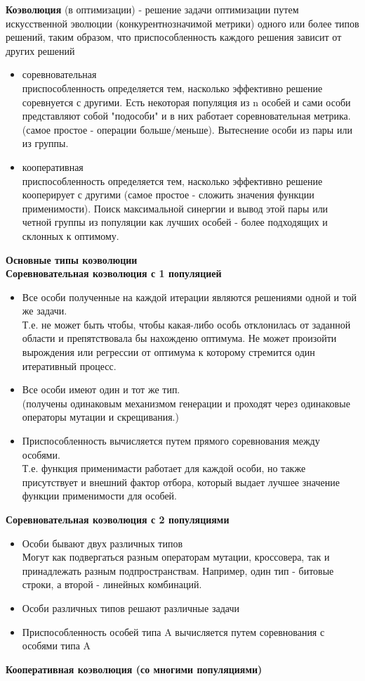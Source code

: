 \textbf{Коэволюция} (в оптимизации) - решение задачи оптимизации путем искусственной эволюции (конкурентнозначимой метрики) одного или более типов решений, таким образом, что приспособленность каждого решения зависит от других решений
\begin{itemize}
    \item соревновательная\\
    приспособленность определяется тем, насколько эффективно решение соревнуется с другими. Есть некоторая популяция из n особей и сами особи представляют собой "подособи" и в них работает соревновательная метрика. (самое простое - операции больше/меньше). Вытеснение особи из пары или из группы.
    \item кооперативная\\
    приспособленность определяется тем, насколько эффективно решение кооперирует с другими (самое простое - сложить значения функции применимости). Поиск максимальной синергии и вывод этой пары или четной группы из популяции как лучших особей - более подходящих и склонных к оптимому. 
\end{itemize}
\textbf{Основные типы коэволюции} \\
\textbf{Соревновательная коэволюция с 1 популяцией}
\begin{itemize}
    \item Все особи полученные на каждой итерации являются решениями одной и той же задачи. \\
    Т.е. не может быть чтобы, чтобы какая-либо особь отклонилась от заданной области и препятствовала бы нахожденю оптимума. Не может произойти вырождения или регрессии от оптимума к которому стремится один итеративный процесс.
    \item Все особи имеют один и тот же тип.\\
    (получены одинаковым механизмом генерации и проходят через одинаковые операторы мутации и скрещивания.)
    \item Приспособленность вычисляется путем прямого соревнования между особями.\\
    Т.е. функция применимасти работает для каждой особи, но также присутствует и внешний фактор отбора, который выдает лучшее значение функции применимости для особей.
\end{itemize}
\textbf{Соревновательная коэволюция с 2 популяциями}
\begin{itemize}
    \item Особи бывают двух различных типов\\
    Могут как подвергаться разным операторам мутации, кроссовера, так и принадлежать разным подпространствам. Например, один тип - битовые строки, а второй - линейных комбинаций.
    \item Особи различных типов решают различные задачи
    \item Приспособленность особей типа A вычисляется путем соревнования с особями типа A
\end{itemize}
\textbf{Кооперативная коэволюция (со многими популяциями)}

